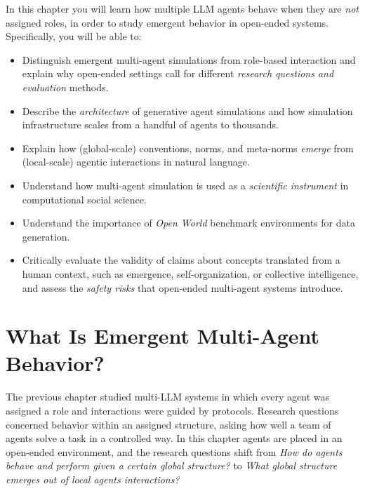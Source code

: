 \begin{learningbox}
In this chapter you will learn how multiple LLM agents behave when they are {\em not} assigned roles, %
in order to study emergent behavior in open-ended systems. Specifically, you will be able to:
\begin{itemize}[leftmargin=*, nosep]
    \item Distinguish emergent multi-agent simulations from role-based interaction and explain why open-ended settings call for different {\em research questions and evaluation} methods.
    \item Describe the {\em architecture} of generative agent  simulations and how simulation infrastructure scales from a handful of agents to thousands.
    \item Explain how (global-scale) conventions, norms, and meta-norms {\em emerge} from (local-scale) agentic interactions in natural language. 
    \item Understand how multi-agent simulation is used as a {\em scientific instrument} in computational social science.
    \item Understand the importance of {\em Open World} benchmark environments for data generation.
    \item Critically evaluate the validity of claims about concepts translated from a human context, such as emergence, self-organization, or collective intelligence, and assess the {\em safety risks} that open-ended multi-agent systems introduce.
\end{itemize}
\end{learningbox}

\section{What Is Emergent Multi-Agent Behavior?}\label{sec:interacting}
The previous chapter studied multi-LLM systems in which every agent was assigned a role and interactions were guided by protocols. Research questions concerned behavior within an assigned structure, asking how well a team of agents solve a task in a controlled way. In this chapter agents are placed in an open-ended environment, and the research questions shift from \emph{How do agents behave and perform given a certain global structure?} to \emph{What global structure emerges out of local  agents interactions?}

